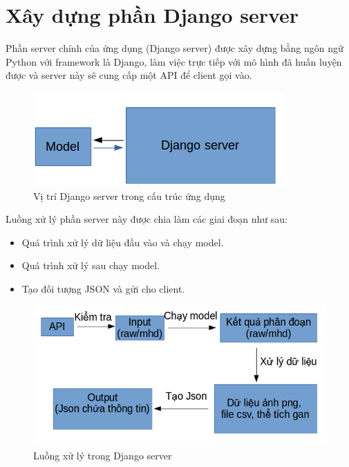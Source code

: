 \section{Xây dựng phần Django server}
Phần server chính của ứng dụng (Django server) được xây dựng bằng ngôn ngữ Python với framework là Django, làm việc trực tiếp với mô hình đã huấn luyện được và server này sẽ cung cấp một API để client gọi vào. 
\begin{figure}[h]
\centering
    \includegraphics[totalheight=5cm]{Images/app_posdjangoserver.png}
    \caption{Vị trí Django server trong cấu trúc ứng dụng}
    \label{skip_conn}
\end{figure}
Luồng xử lý phần server này được chia làm các giai đoạn như sau: 
\begin{itemize}
    \item Quá trình xử lý dữ liệu đầu vào và chạy model.
    \item Quá trình xử lý sau chạy model.
    \item Tạo đối tượng JSON và gửi cho client.
\end{itemize}
\begin{figure}[h]
\centering
    \includegraphics[totalheight=7cm]{Images/app_django_struct.png}
    \caption{Luồng xử lý trong Django server}
    \label{skip_conn}
\end{figure}
